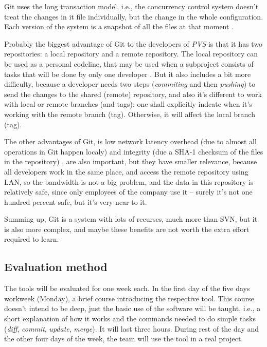 \documentclass[a4paper]{article}
\begin{document}
Git uses the long transaction model, i.e., the concurrency control system doesn't treat the changes in it file individually, but the change in the whole configuration. Each version of the system is a snapshot of all the files at that moment \cite{chacon}.

Probably the biggest advantage of Git to the developers of \emph{PVS} is that it has two repositories: a local repository and a remote repository.
The local repository can be used as a personal codeline, that may be used when a subproject consists of tasks that will be done by only one developer \cite{appleton}.
But it also includes a bit more difficulty, because a developer needs two steps (\emph{commiting} and then \emph{pushing}) to send the changes to the shared (remote) repository, and also it's different to work with local or remote branches (and tags): one shall explicitly indcate when it's working with the remote branch (tag). 
Otherwise, it will affect the local branch (tag).

The other advantages of Git, is low network latency overhead (due to almost all operations in Git happen localy) and integrity (due a SHA-1 checksum of the files in the repository) \cite{chacon}, are also important, but they have smaller relevance, because all developers work in the same place, and access the remote repository using LAN, so the bandwidth is not a big problem, and the data in this repository is relatively safe, since only employees of the company use it -- surely it's not one hundred percent safe, but it's very near to it.

Summing up, Git is a system with lots of recurses, much more than SVN, but it is also more complex, and maybe these benefits are not worth the extra effort required to learn.

\subsection{Evaluation method}

The tools will be evaluated for one week each. 
In the first day of the five days workweek (Monday), a brief course introducing the respective tool.
This course doesn't intend to be deep, just the basic use of the software will be taught, i.e., a short explanation of how it works and the commands needed to do simple tasks (\emph{diff}, \emph{commit}, \emph{update}, \emph{merge}).
It will last three hours.
During rest of the day and the other four days of the week, the team will use the tool in a real project.
\end{document}
